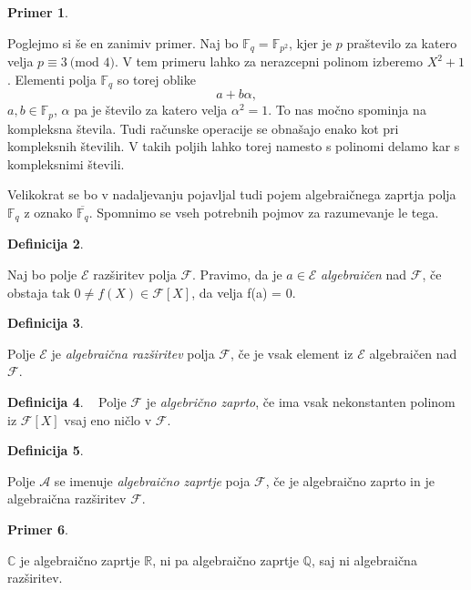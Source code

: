 \documentclass[12pt,a4paper,twoside]{article}
\theoremstyle{definition} %
\newtheorem{definicija}{Definicija}[section]
\newtheorem{primer}[definicija]{Primer}
\theoremstyle{plain} %
\numberwithin{equation}{section}  %
\newcommand{\R}{\mathbb R}
\renewcommand{\C}{\mathbb C}
\newcommand{\Q}{\mathbb Q}
\newcommand{\F}{\mathbb F}
\newcommand{\MOD}[1]{\ \text{(mod }{#1}\text{)}}
\begin{document}
\begin{primer}~

Poglejmo si še en zanimiv primer. Naj bo $\F_q= \F_{p^2}$, kjer je $p$ praštevilo za katero velja $p \equiv 3 \MOD{4}$. V tem primeru lahko za nerazcepni polinom izberemo $X^2+1$. Elementi polja $\F_q$ so torej oblike
$$a+b\alpha,$$
$a,b \in \F_p$, $\alpha$ pa je število za katero velja $\alpha^2 = 1$. To nas močno spominja na kompleksna števila. Tudi računske operacije se obnašajo enako kot pri kompleksnih številih. V takih poljih lahko torej namesto s polinomi delamo kar s kompleksnimi števili.
\end{primer}

Velikokrat se bo v nadaljevanju pojavljal tudi pojem algebraičnega zaprtja polja $\F_q$ z oznako $\overline{\F_q}$. Spomnimo se vseh potrebnih pojmov za razumevanje le tega.

\begin{definicija}~

Naj bo polje $\mathcal{E}$ razširitev polja $\mathcal{F}$. Pravimo, da je $a \in \mathcal{E}$ \emph{algebraičen}
nad $\mathcal{F}$, če obstaja tak $0 \neq f(X) \in \mathcal{F}[X]$, da velja f(a) = 0.

\end{definicija}

\begin{definicija}~

Polje $\mathcal{E}$ je \emph{algebraična razširitev} polja $\mathcal{F}$, če je vsak element
iz $\mathcal{E}$ algebraičen nad $\mathcal{F}$.
\end{definicija}

\begin{definicija}~
Polje $\mathcal{F}$ je \emph{algebrično zaprto}, če ima vsak nekonstanten polinom
iz $\mathcal{F} [X]$ vsaj eno ničlo v $\mathcal{F}$.
\end{definicija}

\begin{definicija}~

Polje $\mathcal{A}$ se imenuje \emph{algebraično zaprtje} poja $\mathcal{F}$, če je algebraično
zaprto in je algebraična razširitev $\mathcal{F}$.
\end{definicija}


\begin{primer}~

$\C$ je algebraično zaprtje $\R$, ni pa algebraično zaprtje $\Q$, saj ni algebraična razširitev.

\end{primer}
\end{document}
